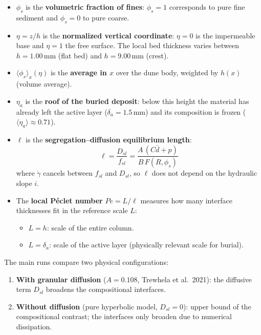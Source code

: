 \documentclass[12pt, a4paper]{article}
\begin{document}
\begin{itemize}
    \item $\phi_s$ is the \textbf{volumetric fraction of fines}: $\phi_s = 1$
          corresponds to pure fine sediment and $\phi_s = 0$ to pure coarse.
    \item $\eta = z/h$ is the \textbf{normalized vertical coordinate}: $\eta = 0$
          is the impermeable base and $\eta = 1$ the free surface. The local
          bed thickness varies between $h = 1.00$\,mm (flat bed) and
          $h = 9.00$\,mm (crest).
    \item $\langle \phi_s \rangle_x(\eta)$ is the \textbf{average in $x$} over
          the dune body, weighted by $h(x)$ (volume average).
    \item $\eta_a$ is the \textbf{roof of the buried deposit}: below
          this height the material has already left the active layer ($\delta_a = 1.5$\,mm)
          and its composition is frozen ($\langle\eta_a\rangle \approx 0.71$).
    \item $\ell$ is the \textbf{segregation--diffusion equilibrium length}:
          \begin{equation}
              \ell = \frac{D_{sl}}{f_{sl}} = \frac{A\,(C\bar{d} + p)}{B\,F(R,\phi_s)}
              \label{eq:ell}
          \end{equation}
          where $\dot{\gamma}$ cancels between $f_{sl}$ and $D_{sl}$, so
          $\ell$ does not depend on the hydraulic slope $i$.
    \item The \textbf{local Péclet number} $Pe = L/\ell$ measures how many interface
          thicknesses fit in the reference scale $L$:
          \begin{itemize}
              \item $L = h$: scale of the entire column.
              \item $L = \delta_a$: scale of the active layer (physically
                    relevant scale for burial).
          \end{itemize}
\end{itemize}

The main runs compare two physical configurations:
\begin{enumerate}
    \item \textbf{With granular diffusion} ($A = 0.108$, Trewhela et al.\ 2021):
          the diffusive term $D_{sl}$ broadens the compositional interfaces.
    \item \textbf{Without diffusion} (pure hyperbolic model, $D_{sl} = 0$): upper
          bound of the compositional contrast; the interfaces only broaden
          due to numerical dissipation.
\end{enumerate}
\end{document}
